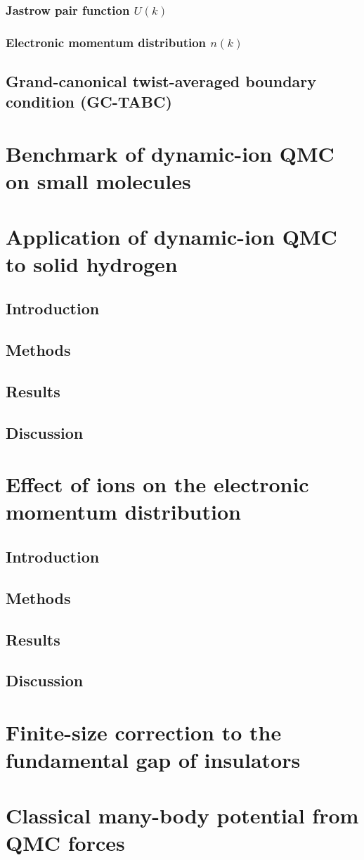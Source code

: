 \documentclass[draftthesis,fullpage]{uiucthesis}
\begin{document}
\subsection{Jastrow pair function $U(k)$}
\subsection{Electronic momentum distribution $n(k)$}
\section{Grand-canonical twist-averaged boundary condition (GC-TABC)}

\chapter{Benchmark of dynamic-ion QMC on small molecules}
%
%

\chapter{Application of dynamic-ion QMC to solid hydrogen}
\section{Introduction}
\section{Methods}
\section{Results}
\section{Discussion}

\chapter{Effect of ions on the electronic momentum distribution}
\section{Introduction}
\section{Methods}
\section{Results}
\section{Discussion}

\chapter{Finite-size correction to the fundamental gap of insulators}
%

\chapter{Classical many-body potential from QMC forces}
\end{document}
